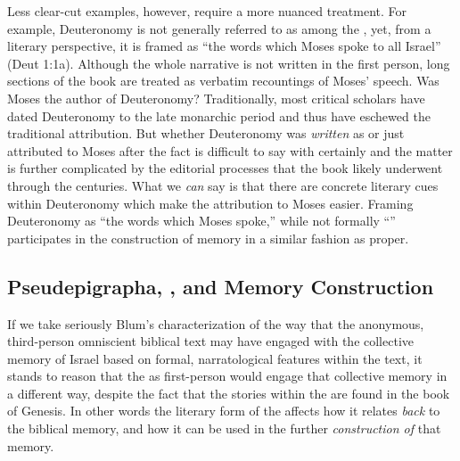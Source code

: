 Less clear-cut examples, however, require a more nuanced treatment. For example, Deuteronomy is not generally referred to as among the \psa, yet, from a literary perspective, it is framed as  ``the words which Moses spoke to all Israel'' (Deut 1:1a). Although the whole narrative is not written in the first person, long sections of the book are treated as verbatim recountings of Moses' speech. Was Moses the author of Deuteronomy? Traditionally, most critical scholars have dated Deuteronomy to the late monarchic period and thus have eschewed the traditional attribution. But whether Deuteronomy was \emph{written} as \psa or just attributed to Moses after the fact is difficult to say with certainly and the matter is further complicated by the editorial processes that the book likely underwent through the centuries.\autocite[143--172]{toorn2007} What we \emph{can} say is that there are concrete literary cues within Deuteronomy which make the attribution to Moses easier. Framing Deuteronomy as ``the words which Moses spoke,'' while not formally ``\psa'' participates in the construction of memory in a similar fashion as \psa proper.

\subsection{Pseudepigrapha, \ga, and Memory Construction}

If we take seriously Blum's characterization of the way that the anonymous, third-person omniscient biblical text may have engaged with the collective memory of Israel based on formal, narratological features within the text, it stands to reason that the \ga as first-person \psy would engage that collective memory in a different way, despite the fact that the stories within the \ga are found in the book of Genesis. In other words the literary form of the \ga affects how it relates \emph{back} to the biblical memory, and how it can be used in the further \emph{construction of} that memory.

